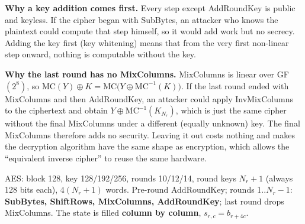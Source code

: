 \begin{center}
\end{center}

\textbf{Why a key addition comes first.} Every step except AddRoundKey is public and keyless. If the cipher began with SubBytes, an attacker who knows the plaintext could compute that step himself, so it would add work but no secrecy. Adding the key first (key whitening) means that from the very first non-linear step onward, nothing is computable without the key.

\textbf{Why the last round has no MixColumns.} MixColumns is linear over GF$(2^8)$, so $\mathrm{MC}(Y) \oplus K = \mathrm{MC}\big(Y \oplus \mathrm{MC}^{-1}(K)\big)$. If the last round ended with MixColumns and then AddRoundKey, an attacker could apply InvMixColumns to the ciphertext and obtain $Y \oplus \mathrm{MC}^{-1}(K_{N_r})$, which is just the same cipher without the final MixColumns under a different (equally unknown) key. The final MixColumns therefore adds no security. Leaving it out costs nothing and makes the decryption algorithm have the same shape as encryption, which allows the ``equivalent inverse cipher'' to reuse the same hardware.

\begin{mustknow}
AES: block 128, key 128/192/256, rounds 10/12/14, round keys $N_r + 1$ (always 128 bits each), $4(N_r + 1)$ words. Pre-round AddRoundKey; rounds 1..$N_r - 1$: \textbf{SubBytes, ShiftRows, MixColumns, AddRoundKey}; last round drops MixColumns. The state is filled \textbf{column by column}, $s_{r,c} = b_{r + 4c}$.
\end{mustknow}

